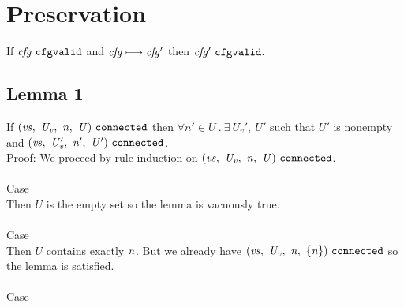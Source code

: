 \documentclass[12pt]{article}
\begin{document}
\section{Preservation}

If $\mathit{cfg}\ \mathtt{cfgvalid}$ and $\mathit{cfg} \longmapsto \mathit{cfg'}$ then
$\mathit{cfg'}\ \mathtt{cfgvalid}$.

\subsection{Lemma 1}

If $(\mathit{vs},\ \mathit{U_v},\ \mathit{n},\ \mathit{U})\ \mathtt{connected}$ then $\forall n'
\in U\ .\ \exists\ U_v',\ U'$ such that $U'$ is nonempty and
$(\mathit{vs},\ \mathit{U_v'},\ \mathit{n'},\ \mathit{U'})\ \mathtt{connected}$.\\

Proof: We proceed by rule induction on
$(\mathit{vs},\ \mathit{U_v},\ \mathit{n},\ \mathit{U})\ \mathtt{connected}$.\\
\\

Case
\\

Then $U$ is the empty set so the lemma is vacuously true.\\
\\

Case
\\

Then $U$ contains exactly $\mathit{n}$. But we already have
$(\mathit{vs},\ \mathit{U_v},\ \mathit{n},\ \{\mathit{n}\})\ \mathtt{connected}$ so
the lemma is satisfied.\\
\\

Case
\\
\end{document}
